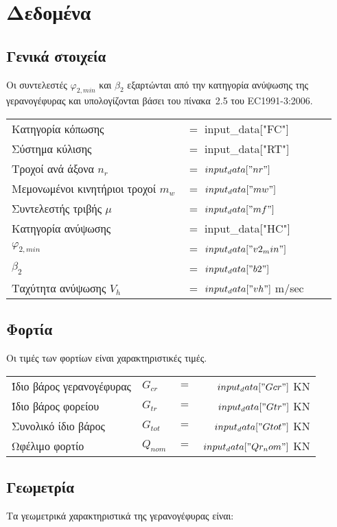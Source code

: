 \section{Δεδομένα}
\subsection{Γενικά στοιχεία}
Οι συντελεστές $φ_{2,min}$ και $β_2$ εξαρτώνται από την κατηγορία ανύψωσης της γερανογέφυρας και υπολογίζονται βάσει του πίνακα~2.5 του EC1991-3:2006.

\begin{tabular}{llcr}
    Κατηγορία κόπωσης                   &$=$ {{ input_data["FC"] }} \\
    Σύστημα κύλισης                     &$=$ {{ input_data["RT"] }}\\
    Τροχοί ανά άξονα    $n_r$           &$=$ ${{ input_data["nr"] }} $ \\
    Μεμονωμένοι κινητήριοι τροχοί $m_w$ &$=$ ${{ input_data["mw"] }}$ \\
    Συντελεστής τριβής $\mu$            &$=$ ${{ input_data["mf"] }}$ \\
    Κατηγορία ανύψωσης                  &$=$ {{ input_data["HC"] }} \\
    $φ_{2,min}$                         &$=$ ${{ input_data["v2_min"] }}$ \\
    $β_2$                               &$=$ ${{ input_data["b2"] }}$ \\
    Ταχύτητα ανύψωσης  $V_h$            &$=$ ${{ input_data["vh"] }}$ m/sec
\end{tabular}

\subsection{Φορτία}
Οι τιμές των φορτίων είναι χαρακτηριστικές τιμές.

\begin{tabular}{llcr}
    Ίδιο βάρος γερανογέφυρας     & $G_{cr}$  &$=$ &${{ input_data["Gcr"] }}$ KN \\
    Ίδιο βάρος φορείου           & $G_{tr}$  &$=$ &${{ input_data["Gtr"] }}$ KN \\
    Συνολικό ίδιο βάρος          & $G_{tot}$ &$=$ &${{ input_data["Gtot"] }}$ KN \\
    Ωφέλιμο φορτίο               & $Q_{nom}$ &$=$ &${{ input_data["Qr_nom"] }}$ KN
\end{tabular}

\subsection{Γεωμετρία}
Τα γεωμετρικά χαρακτηριστικά της γερανογέφυρας είναι:

